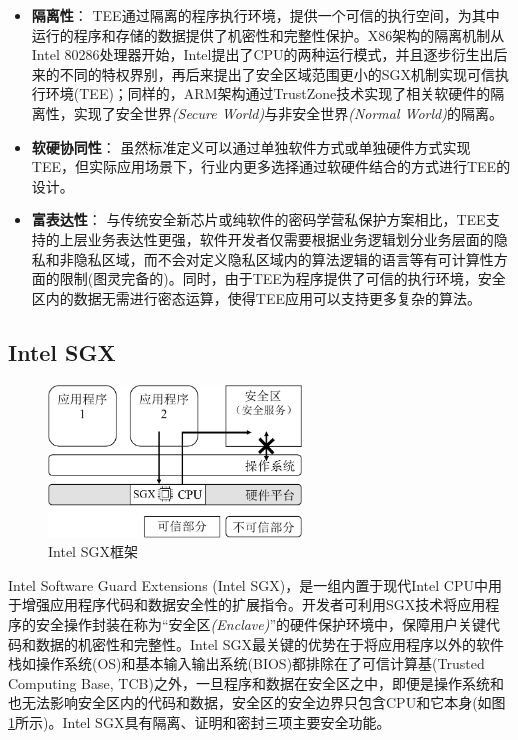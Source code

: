 \begin{itemize}[leftmargin=0em]
    \item \textbf{隔离性}：
          TEE通过隔离的程序执行环境，提供一个可信的执行空间，为其中运行的程序和存储的数据提供了机密性和完整性保护。X86架构的隔离机制从Intel 80286处理器开始，Intel提出了CPU的两种运行模式，并且逐步衍生出后来的不同的特权界别，再后来提出了安全区域范围更小的SGX机制实现可信执行环境(TEE)；同样的，ARM架构通过TrustZone技术实现了相关软硬件的隔离性，实现了安全世界\textit{(Secure World)}与非安全世界\textit{(Normal World)}的隔离。
    \item \textbf{软硬协同性}：
          虽然标准定义可以通过单独软件方式或单独硬件方式实现TEE，但实际应用场景下，行业内更多选择通过软硬件结合的方式进行TEE的设计。
    \item \textbf{富表达性}：
          与传统安全新芯片或纯软件的密码学营私保护方案相比，TEE支持的上层业务表达性更强，软件开发者仅需要根据业务逻辑划分业务层面的隐私和非隐私区域，而不会对定义隐私区域内的算法逻辑的语言等有可计算性方面的限制(图灵完备的)。同时，由于TEE为程序提供了可信的执行环境，安全区内的数据无需进行密态运算，使得TEE应用可以支持更多复杂的算法。
\end{itemize}

\subsection{Intel SGX}
\label{subsec:background-tee-sgx}

\begin{figure}[!htb]
    \small
    \centering
    \includegraphics[width=0.6\textwidth]{pic/background/sgx-example.pdf}
    \caption{Intel SGX框架}
    \label{fig:sgx-arch}
\end{figure}

Intel Software Guard Extensions (Intel SGX)\cite{sgx,sgx2}，是一组内置于现代Intel CPU中用于增强应用程序代码和数据安全性的扩展指令。开发者可利用SGX技术将应用程序的安全操作封装在称为“安全区\textit{(Enclave)}”的硬件保护环境中，保障用户关键代码和数据的机密性和完整性。Intel SGX最关键的优势在于将应用程序以外的软件栈如操作系统(OS)和基本输入输出系统(BIOS)都排除在了可信计算基(Trusted Computing Base, TCB)之外，一旦程序和数据在安全区之中，即便是操作系统和也无法影响安全区内的代码和数据，安全区的安全边界只包含CPU和它本身(如图\ref{fig:sgx-arch}所示)。Intel SGX具有隔离、证明和密封三项主要安全功能。

